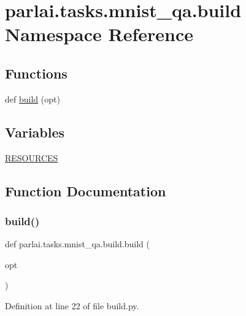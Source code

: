 \hypertarget{namespaceparlai_1_1tasks_1_1mnist__qa_1_1build}{}\section{parlai.\+tasks.\+mnist\+\_\+qa.\+build Namespace Reference}
\label{namespaceparlai_1_1tasks_1_1mnist__qa_1_1build}
\subsection*{Functions}
\begin{DoxyCompactItemize}
\item 
def \hyperlink{namespaceparlai_1_1tasks_1_1mnist__qa_1_1build_a76b349ca8131ab96d2e9991090ec92bb}{build} (opt)
\end{DoxyCompactItemize}
\subsection*{Variables}
\begin{DoxyCompactItemize}
\item 
\hyperlink{namespaceparlai_1_1tasks_1_1mnist__qa_1_1build_a4a925172348e79b08c74a079d215d1fc}{R\+E\+S\+O\+U\+R\+C\+ES}
\end{DoxyCompactItemize}


\subsection{Function Documentation}
\mbox{\label{namespaceparlai_1_1tasks_1_1mnist__qa_1_1build_a76b349ca8131ab96d2e9991090ec92bb}} 
\subsubsection{\texorpdfstring{build()}{build()}}
{\footnotesize\ttfamily def parlai.\+tasks.\+mnist\+\_\+qa.\+build.\+build (\begin{DoxyParamCaption}\item[{}]{opt }\end{DoxyParamCaption})}



Definition at line 22 of file build.\+py.


